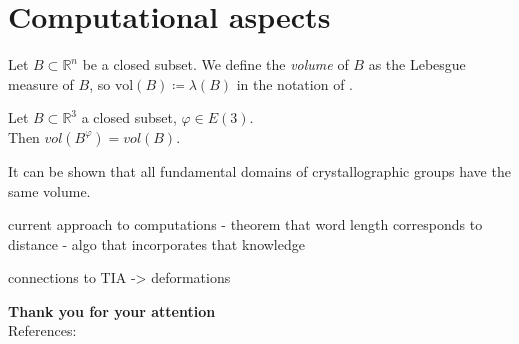 \documentclass{beamer}
\theoremstyle{plain}
\newcommand\R{\mathbb R}
\renewcommand{\phi}{\varphi}
\newcommand{\vol}{\mathrm{vol}}
\begin{document}
\section{Computational aspects}
\begin{frame}
    \begin{definition}
        Let $B\subset \R^n$ be a closed subset. 
        We define the \emph{volume} of $B$ as the Lebesgue measure of $B$, so $\vol(B) \coloneqq \lambda(B)$ in the notation of \cite{forster2012analysis3}. 
    \end{definition} \pause

    \begin{theorem}
        Let $B \subset \R^3$ a closed subset, $\phi \in E(3)$. \\ \pause
        Then $vol(B^\phi) = vol(B)$.
    \end{theorem}
    \pause
    It can be shown that all fundamental domains of crystallographic groups have the same volume.
\end{frame}


\begin{frame}
    current approach to computations
        - theorem that word length corresponds to distance 
        - algo that incorporates that knowledge
\end{frame}

\begin{frame}
    connections to TIA -> deformations
\end{frame}

\begin{frame}
    \textbf{\Large Thank you for your attention}\\ 
    \bigskip
    References:\\
    \printbibliography
\end{frame}
\end{document}
